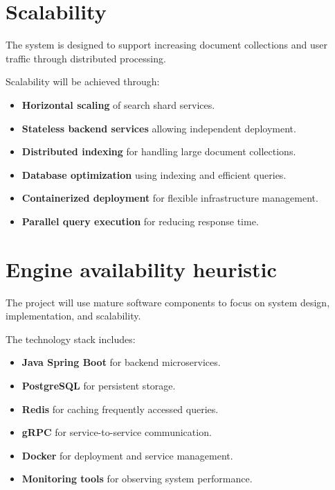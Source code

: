 \documentclass[11pt]{article}
\begin{document}
\section{Scalability}

The system is designed to support increasing document collections and user traffic through distributed processing.

Scalability will be achieved through:

\begin{itemize}

\item \textbf{Horizontal scaling} of search shard services.

\item \textbf{Stateless backend services} allowing independent deployment.

\item \textbf{Distributed indexing} for handling large document collections.

\item \textbf{Database optimization} using indexing and efficient queries.

\item \textbf{Containerized deployment} for flexible infrastructure management.

\item \textbf{Parallel query execution} for reducing response time.

\end{itemize}


\section{Engine availability heuristic}

The project will use mature software components to focus on system design, implementation, and scalability.

The technology stack includes:

\begin{itemize}

\item \textbf{Java Spring Boot} for backend microservices.

\item \textbf{PostgreSQL} for persistent storage.

\item \textbf{Redis} for caching frequently accessed queries.

\item \textbf{gRPC} for service-to-service communication.

\item \textbf{Docker} for deployment and service management.

\item \textbf{Monitoring tools} for observing system performance.

\end{itemize}
\end{document}
